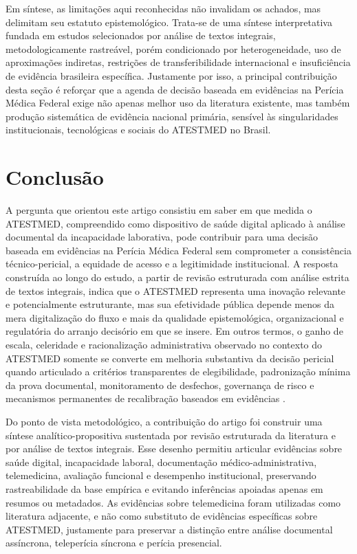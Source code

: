 \documentclass[12pt,a4paper]{article}
\begin{document}
Em síntese, as limitações aqui reconhecidas não invalidam os achados, mas delimitam seu estatuto epistemológico. Trata-se de uma síntese interpretativa fundada em estudos selecionados por análise de textos integrais, metodologicamente rastreável, porém condicionado por heterogeneidade, uso de aproximações indiretas, restrições de transferibilidade internacional e insuficiência de evidência brasileira específica. Justamente por isso, a principal contribuição desta seção é reforçar que a agenda de decisão baseada em evidências na Perícia Médica Federal exige não apenas melhor uso da literatura existente, mas também produção sistemática de evidência nacional primária, sensível às singularidades institucionais, tecnológicas e sociais do ATESTMED no Brasil.

\section{Conclusão}
\label{sec:org22a2662}
A pergunta que orientou este artigo consistiu em saber em que medida o ATESTMED, compreendido como dispositivo de saúde digital aplicado à análise documental da incapacidade laborativa, pode contribuir para uma decisão baseada em evidências na Perícia Médica Federal sem comprometer a consistência técnico-pericial, a equidade de acesso e a legitimidade institucional. A resposta construída ao longo do estudo, a partir de revisão estruturada com análise estrita de textos integrais, indica que o ATESTMED representa uma inovação relevante e potencialmente estruturante, mas sua efetividade pública depende menos da mera digitalização do fluxo e mais da qualidade epistemológica, organizacional e regulatória do arranjo decisório em que se insere. Em outros termos, o ganho de escala, celeridade e racionalização administrativa observado no contexto do ATESTMED somente se converte em melhoria substantiva da decisão pericial quando articulado a critérios transparentes de elegibilidade, padronização mínima da prova documental, monitoramento de desfechos, governança de risco e mecanismos permanentes de recalibração baseados em evidências \parencite{soares20241031t0000000000asistematicadoatestmednaconcessa, steenbeek2011thedevelopmentofinstrumentstomeasuretheworkdisa}.

Do ponto de vista metodológico, a contribuição do artigo foi construir uma síntese analítico-propositiva sustentada por revisão estruturada da literatura e por análise de textos integrais. Esse desenho permitiu articular evidências sobre saúde digital, incapacidade laboral, documentação médico-administrativa, telemedicina, avaliação funcional e desempenho institucional, preservando rastreabilidade da base empírica e evitando inferências apoiadas apenas em resumos ou metadados. As evidências sobre telemedicina foram utilizadas como literatura adjacente, e não como substituto de evidências específicas sobre ATESTMED, justamente para preservar a distinção entre análise documental assíncrona, teleperícia síncrona e perícia presencial.
\end{document}
